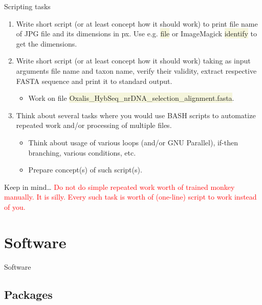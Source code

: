 \documentclass[compress, ucs, xelatex, 11pt, xcolor=svgnames, aspectratio=169,
	hyperref={
		bookmarks=true,
		unicode=true,
		colorlinks=true,
		pdftitle={Linux, command line and MetaCentrum},
		plainpages=false,
		pdfauthor={Vojtech Zeisek},
		pdfsubject={Course about use of Linux command line, writing shell scripts and using MetaCentrum of CESNET},
		pdfcreator={XeLaTeX},
		pdfkeywords={Linux, GNU, BASH, shell, command line, MetaCentrum},
		linkcolor=DarkRed, %
		anchorcolor=DarkBlue, %
		citecolor=Indigo, %
		filecolor=NavyBlue, %
		menucolor=DarkMagenta, %
		urlcolor=DarkBlue, %
		pdftex},
	url={hyphens, lowtilde} %
	]{beamer}
\renewcommand{\texttt}[1]{\colorbox{Beige}{{\ttfamily #1}}}
\renewcommand{\alert}[1]{\textcolor{red}{#1}}
\begin{document}
\begin{frame}{Scripting tasks}
	\begin{enumerate}
		\item Write short script (or at least concept how it should work) to print file name of JPG file and its dimensions in px. Use e.g. \texttt{file} or ImageMagick \texttt{identify} to get the dimensions.
		\item Write short script (or at least concept how it should work) taking as input arguments file name and taxon name, verify their validity, extract respective FASTA sequence and print it to standard output.
		\begin{itemize}
			\item Work on file \texttt{Oxalis\_HybSeq\_nrDNA\_selection\_alignment.fasta}.
		\end{itemize}
		\item Think about several tasks where you would use BASH scripts to automatize repeated work and/or processing of multiple files.
		\begin{itemize}
			\item Think about usage of various loops (and/or GNU Parallel), if-then branching, various conditions, etc.
			\item Prepare concept(s) of such script(s).
		\end{itemize}
	\end{enumerate}
	\begin{block}{Keep in mind\ldots}
		\alert{Do not do simple repeated work worth of trained monkey manually. It is silly. Every such task is worth of (one-line) script to work instead of you.}
	\end{block}
\end{frame}

\section{Software}

\begin{frame}{Software}
	\tableofcontents[currentsection, sectionstyle=show/hide, hideothersubsections]
\end{frame}

\subsection{Packages}
\end{document}

